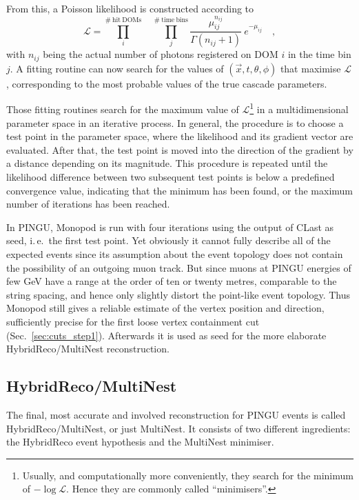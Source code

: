 From this, a Poisson likelihood is constructed according to
\begin{equation}
 \mathcal{L} = \prod_i^\mathrm{\#\ hit\ DOMs} 
   \quad \prod_{j}^\mathrm{\#\ time\ bins}
   \frac{\mu_{ij}^{n_{ij}}}{\Gamma\left(n_{ij}+1\right)}\ e^{-\mu_{ij}} \quad,
\end{equation}
with $n_{ij}$ being the actual number of photons registered on DOM $i$ in the
time bin $j$. A fitting routine can now search for the values of $(\vec{x}, t,
\theta, \phi)$ that maximise $\mathcal{L}$, corresponding to the most
probable values of the true cascade parameters.

Those fitting routines search for the maximum value of
$\mathcal{L}$\footnote{Usually, and computationally more conveniently, they
search for the minimum of $-\log\mathcal{L}$. Hence they are commonly called
``minimisers''.} in a multidimensional parameter
space in an iterative process. In general, the procedure is to choose a test
point in the parameter space, where the likelihood and its gradient vector are
evaluated. After that, the test point is moved into the direction of the
gradient by a distance depending on its magnitude. This procedure is repeated
until the likelihood difference between two subsequent test points is below a
predefined convergence value, indicating that the minimum has been found, or the
maximum number of iterations has been reached.

In PINGU, Monopod is run with four iterations using the output of CLast as
seed, i.\,e.\ the first test point. Yet obviously it cannot fully describe
all of the expected events since its assumption about the event topology does
not contain the possibility of an outgoing muon track. But since muons at PINGU
energies of few GeV have a range at the order of ten or twenty metres,
comparable to the string spacing, and hence only slightly distort the point-like
event topology. Thus Monopod still gives a reliable estimate of the vertex
position and direction, sufficiently precise for the first loose vertex
containment cut (Sec.~\ref{sec:cuts_step1}). Afterwards it is used as seed for
the more elaborate HybridReco/MultiNest reconstruction.

\subsection{HybridReco/MultiNest}
\label{sec:reco_multinest}

The final, most accurate and involved reconstruction for PINGU events is called
HybridReco/MultiNest, or just MultiNest. It consists of two different
ingredients: the HybridReco event hypothesis and the MultiNest minimiser.


